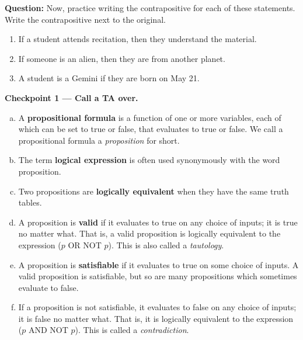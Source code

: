 \documentclass[12pt,letterpaper]{article}
\newenvironment{22enumerate}{\begin{enumerate}[a.]\itemsep0em}{\end{enumerate}}
\begin{document}
     \textbf{Question:} Now, practice writing the contrapositive for each of these statements. Write the contrapositive next to the original.  

     \begin{enumerate}
        \item If a student attends recitation, then they understand the material.
        \item If someone is an alien, then they are from another planet.
        \item A student is a Gemini if they are born on May 21.
      \end{enumerate}
      
    \begin{mdframed} \vspace{2.5cm} \end{mdframed}

    \textbf{Checkpoint 1 — Call a TA over.}
\newpage 
\begin{22enumerate}
	
	\section*{Logic}
	
	\item A \textbf{propositional formula} is a function of one or more variables, each of which can be set to true or false, that evaluates to true or false. We call a propositional formula a \textit{proposition} for short. 
	
	\item The term \textbf{logical expression} is often used synonymously with the word proposition. 
	
	\item Two propositions are \textbf{logically equivalent} when they have  the same truth tables.
	
	\item A proposition is \textbf{valid} if it evaluates to true on any choice of inputs; it is true no matter what. That is, a valid proposition is logically equivalent to the expression ($p$ OR NOT $p$). This is also called a \textit{tautology}. 
	
	\item A proposition is \textbf{satisfiable} if it evaluates to true on some choice of inputs. A valid proposition is satisfiable, but so are many propositions which sometimes evaluate to false.
	
	\item If a proposition is not satisfiable, it evaluates to false on any choice of inputs; it is false no matter what. That is, it is logically equivalent to the expression ($p$ AND NOT $ p$). This is called a \textit{contradiction}.
	
	\end{22enumerate}
\end{document}
